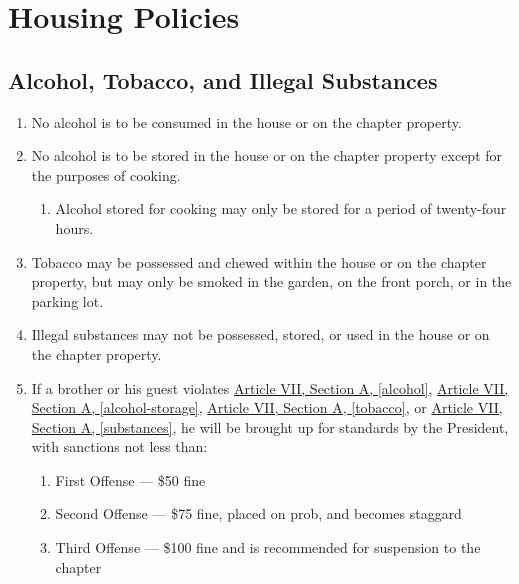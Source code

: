 \chapter{Housing Policies}

\section{Alcohol, Tobacco, and Illegal Substances}

	\begin{enumerate}
		\item No alcohol is to be consumed in the house or on the chapter property. \label{alcohol}

		\item No alcohol is to be stored in the house or on the chapter property except for the purposes of cooking. \label{alcohol-storage}
			\begin{enumerate}
				\item Alcohol stored for cooking may only be stored for a period of twenty-four hours.
			\end{enumerate}

		\item Tobacco may be possessed and chewed within the house or on the chapter property, but may only be smoked in the garden, on the front porch, or in the parking lot. \label{tobacco} 

		\item Illegal substances may not be possessed, stored, or used in the house or on the chapter property. \label{substances}

		\item If a brother or his guest violates \hyperref[alcohol]{Article VII, Section A, \autoref*{alcohol}}, \hyperref[alcohol-storage]{Article VII, Section A, \autoref*{alcohol-storage}}, \hyperref[tobacco]{Article VII, Section A, \autoref*{tobacco}}, or \hyperref[substances]{Article VII, Section A, \autoref*{substances}}, he will be brought up for standards by the President, with sanctions not less than: 
			\begin{enumerate}
				\item First Offense --- \$50 fine
				\item Second Offense --- \$75 fine, placed on \gls{prob}, and becomes \gls{staggard}
				\item Third Offense --- \$100 fine and is recommended for suspension to the chapter
			\end{enumerate} 
		

\end{enumerate}
